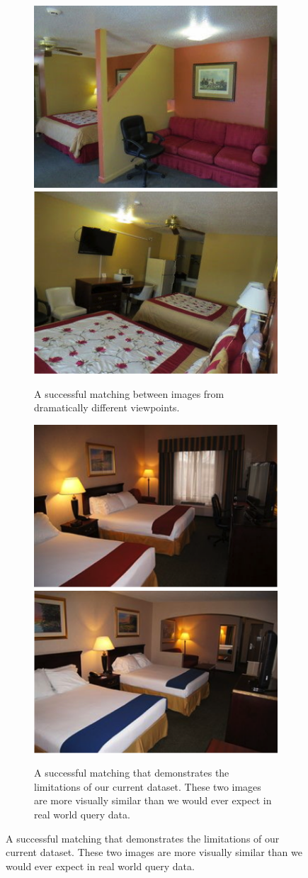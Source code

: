\begin{figure}[p]
  \begin{center}
  
  \begin{subfigure}[b]{.9\textwidth}
    \includegraphics[width=.5\columnwidth]{figures/chapter2/good2a.png}
    \includegraphics[width=.5\columnwidth]{figures/chapter2/good2b.png}
    \caption{A successful matching between images from dramatically different viewpoints.}
  \end{subfigure}
  
  \begin{subfigure}[b]{.9\textwidth}
    \includegraphics[width=.5\columnwidth]{figures/chapter2/good1a.png}
    \includegraphics[width=.5\columnwidth]{figures/chapter2/good1b.png}
    \caption{A successful matching that demonstrates the limitations of our current dataset. These two images are more visually similar than we would ever expect in real world query data.}
  \end{subfigure}
  

\end{center}
\end{figure}
